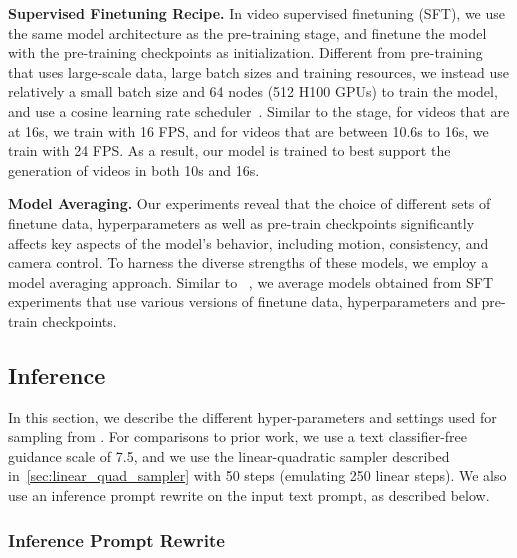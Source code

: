 \noindent \textbf{Supervised Finetuning Recipe.} In video supervised finetuning (SFT), we use the same model architecture as the pre-training stage, and finetune the model with the pre-training checkpoints as initialization.
Different from pre-training that uses large-scale data, large batch sizes and training resources, we instead use relatively a small batch size and 64 nodes (512 H100 GPUs) to train the model, and use a cosine learning rate scheduler~\citep{loshchilov2016sgdr}.
Similar to the \pretraining stage, for videos that are at 16s, we train with 16 FPS, and for videos that are between 10.6s to 16s, we train with 24 FPS.
As a result, our model is trained to best support the generation of videos in both 10s and 16s.


\noindent \textbf{Model Averaging.}
Our experiments reveal that the choice of different sets of finetune data, hyperparameters as well as pre-train checkpoints significantly affects key aspects of the model's behavior, including motion, consistency, and camera control. To harness the diverse strengths of these models, we employ a model averaging approach.
Similar to \llama~\citep{llama3}, we average models obtained from SFT experiments that use various versions of finetune data, hyperparameters and pre-train checkpoints.





\subsection{Inference} \label{T2V_inference_details}
In this section, we describe the different hyper-parameters and settings used for sampling from \OursVideo.
For comparisons to prior work, we use a text classifier-free guidance scale of 7.5, and we use the linear-quadratic sampler described in~\cref{sec:linear_quad_sampler} with 50 steps (emulating 250 linear steps).
We also use an inference prompt rewrite on the input text prompt, as described below.
\subsubsection{Inference Prompt Rewrite} %
\label{sec:t2v_prompt_rewrite}

